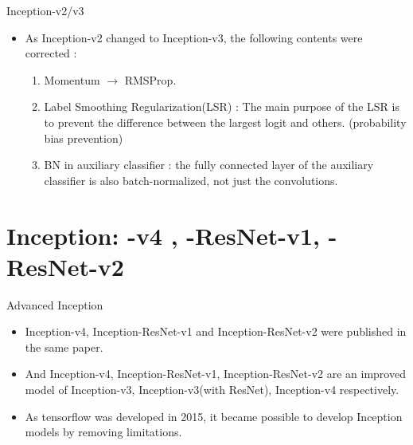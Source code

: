 \documentclass{beamer}
\begin{document}
\begin{frame}{Inception-v2/v3}
	\begin{itemize}
		\item As Inception-v2 changed to Inception-v3, the following contents were corrected :
		\vspace{7pt}
		\begin{enumerate}
			\item Momentum $\rightarrow$ RMSProp.
			\vspace{4pt}
			\item Label Smoothing Regularization(LSR) : The main purpose of the LSR is to prevent the difference between the largest logit and others. (probability bias prevention)
			\vspace{4pt}
			\item BN in auxiliary classifier : the fully connected layer of the auxiliary classifier is also batch-normalized, not just the convolutions.
		\end{enumerate}
	\end{itemize}
\end{frame}


\section{Inception: -v4 , -ResNet-v1, -ResNet-v2}
\begin{frame}{Advanced Inception}
	\begin{itemize}
		\item Inception-v4, Inception-ResNet-v1 and Inception-ResNet-v2 were published in the same paper\cite{v4etc}.
		\item And Inception-v4, Inception-ResNet-v1, Inception-ResNet-v2 are an improved model of Inception-v3, Inception-v3(with ResNet), Inception-v4 respectively.
		\item As tensorflow\cite{tensorflow} was developed in 2015, it became possible to develop Inception models by removing limitations.
	\end{itemize}
\end{frame}
\end{document}
